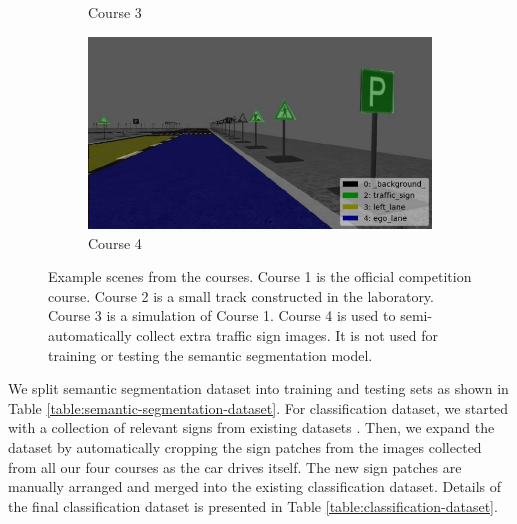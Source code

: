 \begin{figure}[h]
\begin{subfigure}[b]{0.4\linewidth}
    \caption{Course 3}
  \end{subfigure}
  \begin{subfigure}[b]{0.4\linewidth}
    \includegraphics[width=\linewidth]{figures/course4.jpg}
    \caption{Course 4}
  \end{subfigure}
  \caption[Real and simulated course scenes]{Example scenes from the courses.
    Course 1 is the official competition course. Course 2 is a small track
    constructed in the laboratory. Course 3 is a simulation of Course 1. Course
    4 is used to semi-automatically collect extra traffic sign images. It is
    not used for training or testing the semantic segmentation model.}
  \label{figure:annotated-courses}
\end{figure}

We split semantic segmentation dataset into training and testing sets as shown
in Table \ref{table:semantic-segmentation-dataset}. For classification dataset,
we started with a collection of relevant signs from existing datasets
\cite{Timofte2009MultiviewTS, Stallkamp2012ManVC, Shakhuro2016RussianTS,
Serna2018ClassificationOT, MaldonadoBascn2007RoadSignDA}. Then, we expand the
dataset by automatically cropping the sign patches from the images collected
from all our four courses as the car drives itself. The new sign patches are
manually arranged and merged into the existing classification dataset. Details
of the final classification dataset is presented in Table
\ref{table:classification-dataset}.


